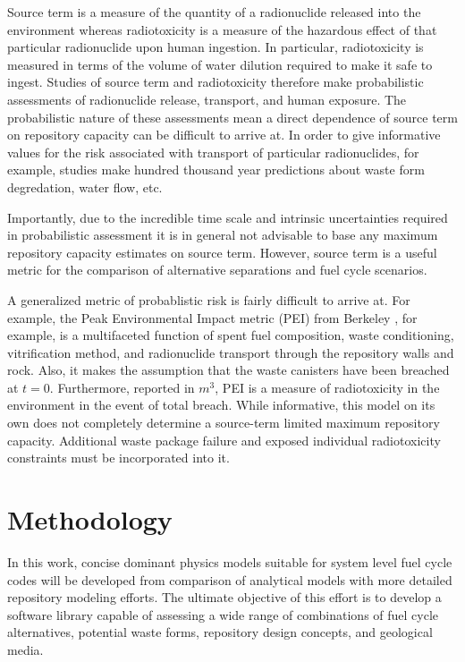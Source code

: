 Source term is a measure of the quantity of a radionuclide released 
into the environment whereas radiotoxicity is a measure of the 
hazardous effect of that particular radionuclide upon human ingestion.  
In particular, radiotoxicity is measured in terms of the volume of 
water dilution required to make it safe to ingest. Studies of source 
term and radiotoxicity therefore make probabilistic assessments of 
radionuclide release, transport, and human exposure.  The 
probabilistic nature of these assessments mean a direct dependence of 
source term on repository capacity can be difficult to arrive at. In 
order to give informative values for the risk associated with 
transport of particular radionuclides, for example, studies make 
hundred thousand year predictions about waste form degredation, water 
flow, etc.  

Importantly, due to the incredible time scale and intrinsic 
uncertainties required in probabilistic assessment it is in general 
not advisable to base any maximum repository capacity estimates on 
source term. However, source term is a useful metric for the 
comparison of alternative separations and fuel cycle scenarios.

A generalized metric of probablistic risk is fairly difficult to 
arrive at. For example, the Peak Environmental Impact metric (PEI) 
from Berkeley \cite{bouvier_comparison_2007}, for example, is a 
multifaceted function of spent fuel composition, waste conditioning, 
vitrification method, and radionuclide transport through the 
repository walls and rock.  Also, it makes the assumption that the 
waste canisters have been breached at $t=0$. Furthermore, reported in 
$m^3$, PEI is a measure of radiotoxicity in the environment in the 
event of total breach. While informative, this model on its own does 
not completely determine a source-term limited maximum repository 
capacity. Additional waste package failure and exposed individual 
radiotoxicity constraints must be incorporated into it.

\section{Methodology} 

In this work, concise dominant physics models suitable for system 
level fuel cycle codes will be developed from comparison of analytical 
models with more detailed repository modeling efforts. The ultimate 
objective of this effort is to develop a software library capable of 
assessing a wide range of combinations of fuel cycle alternatives, 
potential waste forms, repository design concepts, and geological 
media. 

